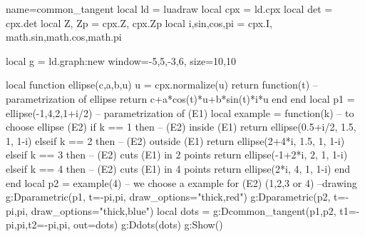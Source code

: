 \documentclass{standalone}
\begin{document}
\begin{luadraw}{name=common_tangent}
local ld = luadraw
local cpx = ld.cpx
local det = cpx.det
local Z, Zp = cpx.Z, cpx.Zp
local i,sin,cos,pi = cpx.I, math.sin,math.cos,math.pi

local g = ld.graph:new{ window={-5,5,-3,6}, size={10,10} }

local function ellipse(c,a,b,u)
    u = cpx.normalize(u)
    return function(t) -- parametrization of ellipse
            return c+a*cos(t)*u+b*sin(t)*i*u
        end
end
local p1 = ellipse(-1,4,2,1+i/2) -- parametrization of (E1)
local example = function(k) -- to choose ellipse (E2)
    if k == 1 then -- (E2) inside (E1)        
        return ellipse(0.5+i/2, 1.5, 1, 1-i)
    elseif k == 2 then -- (E2) outside (E1)
        return ellipse(2+4*i, 1.5, 1, 1-i)
    elseif k == 3 then -- (E2) cuts (E1) in 2 points
        return ellipse(-1+2*i, 2, 1, 1-i)
    elseif k == 4 then -- (E2) cuts (E1) in 4 points
        return ellipse(2*i, 4, 1, 1-i)
    end
end
local p2 = example(4) -- we choose a example for (E2) (1,2,3 or 4)
--drawing
g:Dparametric(p1, {t={-pi,pi}, draw_options="thick,red"})
g:Dparametric(p2, {t={-pi,pi}, draw_options="thick,blue"})
local dots = {}
g:Dcommon_tangent(p1,p2, {t1={-pi,pi},t2={-pi,pi}, out=dots})
g:Ddots(dots)
g:Show()
\end{luadraw}
\end{document}
